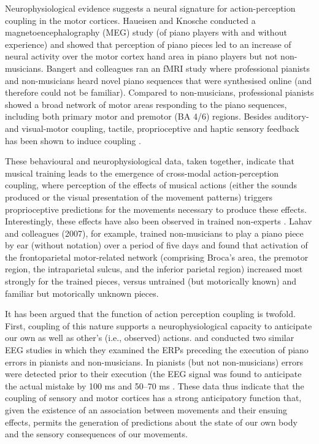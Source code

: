 \begin{CJK}{UTF8}{gbsn}
Neurophysiological evidence suggests a neural signature for action-perception coupling in the motor cortices.  Haueisen and Knosche \citep{Haueisen2001} conducted a magnetoencephalography (MEG) study (of piano players with and without experience) and showed that perception of piano pieces led to an increase of neural activity over the motor cortex hand area in piano players but not non-musicians.  Bangert and colleagues \textcite{Bangert2006} ran an fMRI study where professional pianists and non-musicians heard novel piano sequences that were synthesised online (and therefore could not be familiar).  Compared to non-musicians, professional pianists showed a broad network of motor areas responding to the piano sequences, including both primary motor and premotor (BA 4/6) regions.  Besides auditory- and visual-motor coupling, tactile, proprioceptive and haptic sensory feedback has been shown to induce coupling \citep{Schulz2003,Kuchenbuch2014}.

These behavioural and neurophysiological data, taken together, indicate that musical training leads to the emergence of cross-modal action-perception coupling, where perception of the effects of musical actions (either the sounds produced or the visual presentation of the movement patterns) triggers proprioceptive predictions for the movements necessary to produce these effects. Interestingly, these effects have also been observed in trained non-experts \citep{Bangert2003,Lahav2007}.  Lahav and colleagues (2007), for example, trained non-musicians to play a piano piece by ear (without notation) over a period of five days and found that activation of the frontoparietal motor-related network (comprising Broca’s area, the premotor region, the intraparietal sulcus, and the inferior parietal region) increased most strongly for the trained pieces, versus untrained (but motorically known) and familiar but motorically unknown pieces.

It has been argued that the function of action perception coupling is twofold.  First, coupling of this nature supports a neurophysiological capacity to anticipate our own as well as other's  (i.e., observed) actions.  \textcite{Maidhof2009} and \textcite{Ruiz2009} conducted two similar EEG studies in which they examined the ERPs preceding the execution of piano errors in pianists and non-musicians.  In pianists (but not non-musicians) errors were detected prior to their execution (the EEG signal was found to anticipate the actual mistake by 100 ms \citep{Maidhof2009} and 50–70 ms \citep{Ruiz009}.  These data thus indicate that the coupling of sensory and motor cortices has a strong anticipatory function that, given the existence of an association between movements and their ensuing effects, permits the generation of predictions about the state of our own body and the sensory consequences of our movements.


\end{CJK}
